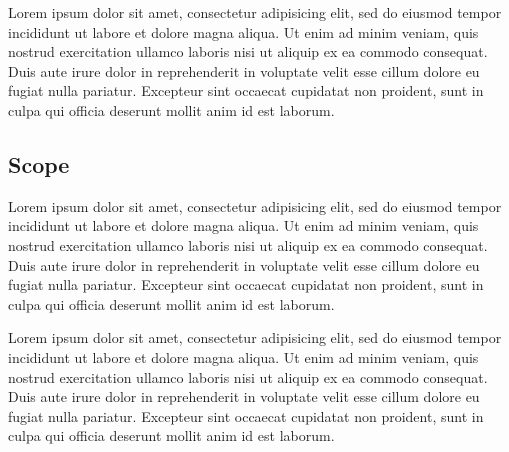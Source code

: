 \documentclass[10pt,a4paper]{article}
\begin{document}
\begin{titlepage}
Lorem ipsum dolor sit amet, consectetur adipisicing elit, sed do eiusmod tempor incididunt ut labore et dolore magna aliqua. Ut enim ad minim veniam, quis nostrud exercitation ullamco laboris nisi ut aliquip ex ea commodo consequat. Duis aute irure dolor in reprehenderit in voluptate velit esse cillum dolore eu fugiat nulla pariatur. Excepteur sint occaecat cupidatat non proident, sunt in culpa qui officia deserunt mollit anim id est laborum.

\subsection{Scope}
Lorem ipsum dolor sit amet, consectetur adipisicing elit, sed do eiusmod tempor incididunt ut labore et dolore magna aliqua. Ut enim ad minim veniam, quis nostrud exercitation ullamco laboris nisi ut aliquip ex ea commodo consequat. Duis aute irure dolor in reprehenderit in voluptate velit esse cillum dolore eu fugiat nulla pariatur. Excepteur sint occaecat cupidatat non proident, sunt in culpa qui officia deserunt mollit anim id est laborum.

Lorem ipsum dolor sit amet, consectetur adipisicing elit, sed do eiusmod tempor incididunt ut labore et dolore magna aliqua. Ut enim ad minim veniam, quis nostrud exercitation ullamco laboris nisi ut aliquip ex ea commodo consequat. Duis aute irure dolor in reprehenderit in voluptate velit esse cillum dolore eu fugiat nulla pariatur. Excepteur sint occaecat cupidatat non proident, sunt in culpa qui officia deserunt mollit anim id est laborum.

 
\end{titlepage}





 
\end{document}
